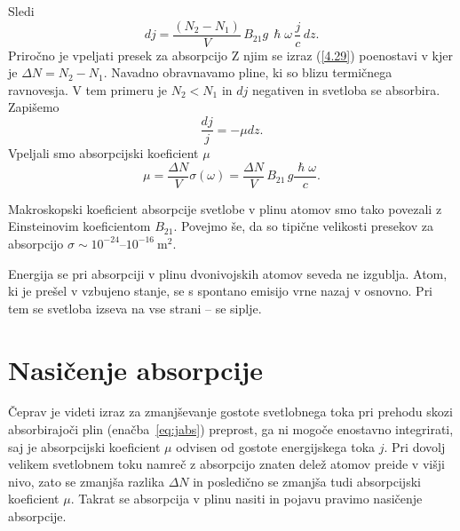 Sledi
\begin{equation}
dj=\frac{(N_{2}-N_{1})}{V}\, B_{21}g\, \hslash\omega\,\frac{j}{c}\, dz.
\label{4.29}
\end{equation}
Priročno je vpeljati presek za absorpcijo 
Z njim se izraz (\ref{4.29}) poenostavi v 
kjer je $\Delta N = N_{2}-N_{1}$.
Navadno obravnavamo pline, ki so blizu termičnega ravnovesja. V tem primeru 
je $N_{2}<N_{1}$ in $dj$ negativen in svetloba se absorbira.
Zapišemo 
\begin{equation}
\frac{dj}{j} = -\mu dz.
\label{eq:jabs}
\end{equation}
Vpeljali smo absorpcijski koeficient $\mu$ 
\begin{equation}
\mu=\frac{\Delta N}{V}\sigma(\omega)=
\frac{\Delta N}{V}\, B_{21}\, g\frac{\hslash\omega}{c}.
\label{eq:muabs1}
\end{equation}
 
Makroskopski koeficient absorpcije svetlobe v plinu atomov smo tako povezali
z Einsteinovim koefici\-entom $B_{21}$. Povejmo še, da so 
tipične velikosti presekov za absorpcijo $\sigma \sim 10^{-24}$--$10^{-16}~\si{\metre^2}$.

\begin{remark}
Energija se pri absorpciji v plinu dvonivojskih atomov seveda
ne izgublja. Atom, ki je prešel v vzbujeno stanje, se s spontano 
emisijo vrne nazaj v osnovno. Pri tem se svetloba izseva na vse strani -- se siplje. 
\end{remark}

\section{Nasičenje absorpcije}
\label{chap:NasAbs}
Čeprav je videti izraz za zmanjševanje 
gostote svetlobnega toka pri prehodu skozi absorbirajoči plin (enačba~\ref{eq:jabs}) 
preprost, ga ni mogoče enostavno integrirati, saj je absorpcijski koeficient 
$\mu$ odvisen od 
gostote energijskega toka $j$. Pri dovolj velikem svetlobnem toku namreč z 
absorpcijo znaten delež atomov preide v višji nivo, zato se zmanjša razlika $\Delta N$
in posledično se zmanjša tudi absorpcijski koeficient $\mu$. Takrat se absorpcija
v plinu nasiti in pojavu pravimo nasičenje absorpcije.

